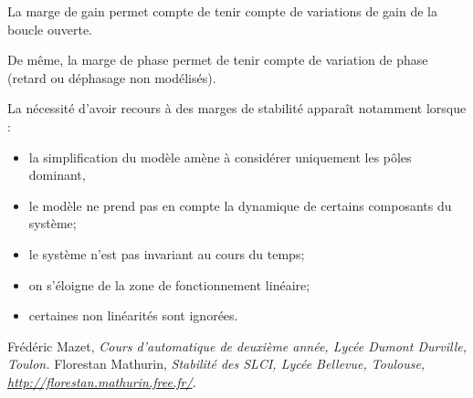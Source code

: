  
La marge de gain permet compte de tenir compte de variations de gain de la boucle ouverte. 

De même, la marge de phase permet de tenir compte de variation de phase (retard ou déphasage non modélisés). 

La nécessité d'avoir recours à des marges de stabilité apparaît notamment lorsque : 
\begin{itemize}
\item la simplification du modèle amène à considérer uniquement les pôles dominant, 
\item le modèle ne prend pas en compte la dynamique de certains composants du système;
\item le système n'est pas invariant au cours du temps;
\item on s'éloigne de la zone de fonctionnement linéaire;
\item certaines non linéarités sont ignorées.
\end{itemize}

\begin{thebibliography}{2}
    Frédéric Mazet, {\it Cours d'automatique de deuxième année, Lycée Dumont Durville, Toulon.}
       Florestan Mathurin, {\it Stabilité des SLCI, Lycée Bellevue, Toulouse, \url{http://florestan.mathurin.free.fr/}.}

\end{thebibliography}

